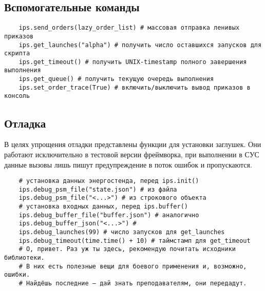 \subsection*{Вспомогательные команды}

\begin{verbatim}
    ips.send_orders(lazy_order_list) # массовая отправка ленивых приказов 
    ips.get_launches("alpha") # получить число оставшихся запусков для скрипта 
    ips.get_timeout() # получить UNIX-timestamp полного завершения выполнения 
    ips.get_queue() # получить текущую очередь выполнения 
    ips.set_order_trace(True) # включить/выключить вывод приказов в консоль 
\end{verbatim}

\subsection*{Отладка}

В целях упрощения отладки представлены функции для установки заглушек. Они работают исключительно в тестовой версии фреймворка, при выполнении в СУС данные вызовы лишь пишут предупреждение в поток ошибок и пропускаются. 

\begin{verbatim}
    # установка данных энергостенда, перед ips.init() 
    ips.debug_psm_file("state.json") # из файла 
    ips.debug_psm_file("<...>") # из строкового объекта 
    # установка входных данных, перед ips.buffer() 
    ips.debug_buffer_file("buffer.json") # аналогично 
    ips.debug_buffer_json("<...>") # 
    ips.debug_launches(99) # число запусков для get_launches 
    ips.debug_timeout(time.time() + 10) # таймстамп для get_timeout 
    # О, привет. Раз уж ты здесь, рекомендую почитать исходники библиотеки. 
    # В них есть полезные вещи для боевого применения и, возможно, ошибки. 
    # Найдёшь последние — дай знать преподавателям, они передадут.
\end{verbatim}
